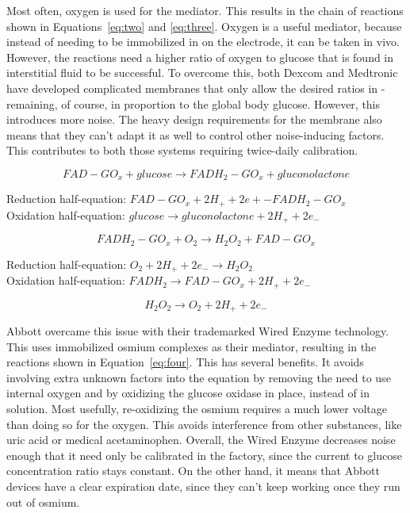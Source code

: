 Most often, oxygen is used for the mediator. This results in the chain of reactions shown in Equations~\ref{eq:two} and \ref{eq:three}. Oxygen is a useful mediator, because instead of needing to be immobilized in on the electrode, it can be taken in vivo. However, the reactions need a higher ratio of oxygen to glucose that is found in interstitial fluid to be successful. To overcome this, both Dexcom and Medtronic have developed complicated membranes that only allow the desired ratios in - remaining, of course, in proportion to the global body glucose\cite{noauthor_mary_nodate}. However, this introduces more noise. The heavy design requirements for the membrane also means that they can’t adapt it as well to control other noise-inducing factors. This contributes to both those systems requiring twice-daily calibration.

\begin{equation} \label{eq:one}
FAD-GO_x + glucose \rightarrow FADH_2-GO_x + gluconolactone
\end{equation}

Reduction half-equation: $FAD-GO_x + 2H_+ + 2e+-  FADH_2-GO_x$\\ 
Oxidation half-equation: $glucose \rightarrow gluconolactone + 2H_+ + 2e_- $

\begin{equation} \label{eq:two}
FADH_2 - GO_x + O_2 \rightarrow H_2O_2 + FAD-GO_x 
\end{equation}

Reduction half-equation: $O_2 + 2H_+ + 2e_- \rightarrow H_2O_2$ \\
Oxidation half-equation: $FADH_2 \rightarrow FAD-GO_x + 2H_+ + 2e_-$ 

\begin{equation} \label{eq:three}
 H_2O_2 \rightarrow O_2 + 2H_+ + 2e_- 
\end{equation}

Abbott overcame this issue with their trademarked  Wired Enzyme technology\cite{noauthor_sensor_nodate}. This uses immobilized osmium complexes as their mediator, resulting in the reactions shown in Equation~\ref{eq:four}. This has several benefits. It avoids involving extra unknown factors into the equation by removing the need to use internal oxygen and by oxidizing the glucose oxidase in place, instead of in solution. Most usefully, re-oxidizing the osmium requires a much lower voltage than doing so for the oxygen. This avoids interference from other substances, like uric acid or medical acetaminophen\cite{noauthor_mary_nodate}. Overall, the Wired Enzyme decreases noise enough that it need only be calibrated in the factory, since the current to glucose concentration ratio stays constant\cite{hoss_feasibility_2014}. On the other hand, it means that Abbott devices have a clear expiration date, since they can’t keep working once they run out of osmium.


